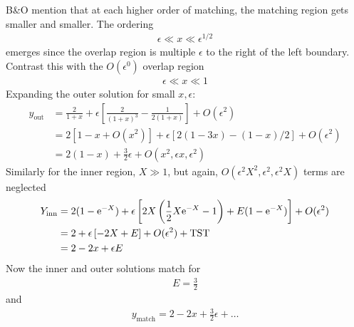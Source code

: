 B\&O mention that at each higher order of matching, the matching region gets smaller and smaller. The ordering
\begin{gather*}
	\epsilon \ll x \ll \epsilon^{1/2}
\end{gather*}
emerges since the overlap region is multiple $\epsilon$ to the right of the left boundary. Contrast this with the $O(\epsilon^0)$ overlap region
\begin{gather*}
	\epsilon \ll x \ll 1
\end{gather*}
Expanding the outer solution for small $x,\epsilon$:
\begin{align*}
	y_\mathrm{out} &= \frac{2}{1+x} + \epsilon \left[\frac{2}{(1+x)^3}-\frac{1}{2(1+x)}\right] + O(\epsilon^2)\\
	&= 2 [1-x + O(x^2)] + \epsilon [2(1-3x) - (1-x)/2] + O(\epsilon^2) \\
	&= 2(1-x) + \frac{3}{2}\epsilon + O(x^2,\epsilon x, \epsilon^2)
\end{align*}
Similarly for the inner region, $X\gg 1$, but again, $O(\epsilon^2 X^2, \epsilon^2, \epsilon^2 X)$ terms are neglected
\begin{align*}
	Y_\mathrm{inn} &= 2(1-\mathrm{e}^{-X}) + \epsilon \left[ 2X\left(\frac{1}{2}X\mathrm{e}^{-X} - 1\right) + {E(1-\mathrm{e}^{-X})}\right] + O(\epsilon^2) \\
	&= 2 + \epsilon \left[-2X + E\right] + O(\epsilon^2) + \mathrm{TST} \\
	&= 2 - 2x + \epsilon E 
\end{align*}
Now the inner and outer solutions match for 
\begin{gather*}
	E = \frac{3}{2}
\end{gather*}
and
\begin{align*}
	y_\mathrm{match} = 2 - 2x + \frac{3}{2}\epsilon + \dots 
\end{align*}
